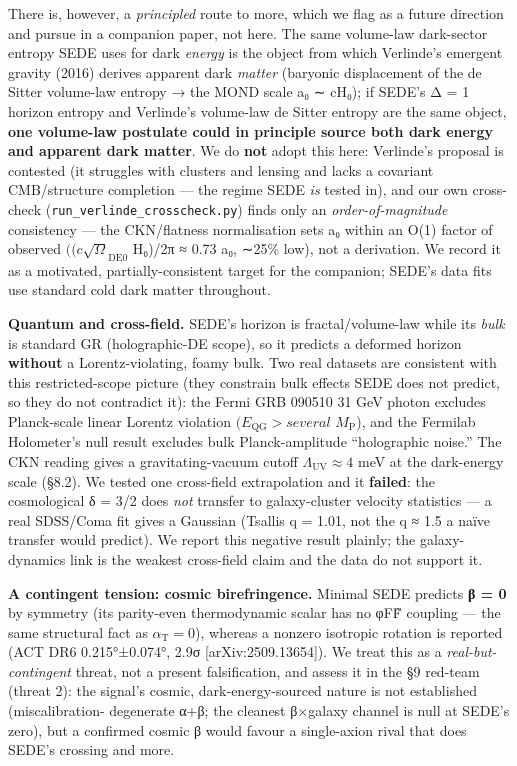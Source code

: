 \documentclass[
  10pt,
]{article}
\begin{document}
There is, however, a \emph{principled} route to more, which we flag as a
future direction and pursue in a companion paper, not here. The same
volume-law dark-sector entropy SEDE uses for dark \emph{energy} is the
object from which Verlinde's emergent gravity (2016) derives apparent
dark \emph{matter} (baryonic displacement of the de Sitter volume-law
entropy → the MOND scale a₀ ∼ cH₀); if SEDE's Δ = 1 horizon entropy and
Verlinde's volume-law de Sitter entropy are the same object, \textbf{one
volume-law postulate could in principle source both dark energy and
apparent dark matter}. We do \textbf{not} adopt this here: Verlinde's
proposal is contested (it struggles with clusters and lensing and lacks
a covariant CMB/structure completion --- the regime SEDE \emph{is}
tested in), and our own cross-check
(\texttt{run\_verlinde\_crosscheck.py}) finds only an
\emph{order-of-magnitude} consistency --- the CKN/flatness normalisation
sets a₀ within an O(1) factor of observed
\(((c\surd \Omega _{\mathrm{DE0}}\) H₀)/2π ≈ 0.73 a₀, ∼25\% low), not a
derivation. We record it as a motivated, partially-consistent target for
the companion; SEDE's data fits use standard cold dark matter
throughout.

\textbf{Quantum and cross-field.} SEDE's horizon is fractal/volume-law
while its \emph{bulk} is standard GR (holographic-DE scope), so it
predicts a deformed horizon \textbf{without} a Lorentz-violating, foamy
bulk. Two real datasets are consistent with this restricted-scope
picture (they constrain bulk effects SEDE does not predict, so they do
not contradict it): the Fermi GRB 090510 31 GeV photon excludes
Planck-scale linear Lorentz violation \((E_{\mathrm{QG}} > several\)
\(M_{\mathrm{P}}\)), and the Fermilab Holometer's null result excludes
bulk Planck-amplitude ``holographic noise.'' The CKN reading gives a
gravitating-vacuum cutoff \(\Lambda _{\mathrm{UV}} \approx  4\) meV at
the dark-energy scale (§8.2). We tested one cross-field extrapolation
and it \textbf{failed}: the cosmological δ = 3/2 does \emph{not}
transfer to galaxy-cluster velocity statistics --- a real SDSS/Coma fit
gives a Gaussian (Tsallis q = 1.01, not the q ≈ 1.5 a naïve transfer
would predict). We report this negative result plainly; the
galaxy-dynamics link is the weakest cross-field claim and the data do
not support it.

\textbf{A contingent tension: cosmic birefringence.} Minimal SEDE
predicts \textbf{β = 0} by symmetry (its parity-even thermodynamic
scalar has no φFF̃ coupling --- the same structural fact as
\(\alpha _{\mathrm{T}} = 0\)), whereas a nonzero isotropic rotation is
reported (ACT DR6 0.215°±0.074°, 2.9σ {[}arXiv:2509.13654{]}). We treat
this as a \emph{real-but-contingent} threat, not a present
falsification, and assess it in the §9 red-team (threat 2): the signal's
cosmic, dark-energy-sourced nature is not established (miscalibration-
degenerate α+β; the cleanest β×galaxy channel is null at SEDE's zero),
but a confirmed cosmic β would favour a single-axion rival that does
SEDE's crossing and more.
\end{document}
